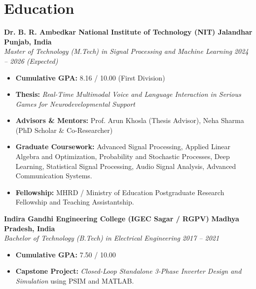 \documentclass[10pt,a4paper]{article}
\begin{document}
\section*{Education}

\textbf{Dr. B. R. Ambedkar National Institute of Technology (NIT) Jalandhar} \hfill \textbf{Punjab, India} \\
\textit{Master of Technology (M.Tech) in Signal Processing and Machine Learning} \hfill \textit{2024 -- 2026 (Expected)}
\begin{itemize}
    \item \textbf{Cumulative GPA:} 8.16 / 10.00 (First Division)
    \item \textbf{Thesis:} \textit{Real-Time Multimodal Voice and Language Interaction in Serious Games for Neurodevelopmental Support}
    \item \textbf{Advisors \& Mentors:} Prof. Arun Khosla (Thesis Advisor), Neha Sharma (PhD Scholar \& Co-Researcher)
    \item \textbf{Graduate Coursework:} Advanced Signal Processing, Applied Linear Algebra and Optimization, Probability and Stochastic Processes, Deep Learning, Statistical Signal Processing, Audio Signal Analysis, Advanced Communication Systems.
    \item \textbf{Fellowship:} MHRD / Ministry of Education Postgraduate Research Fellowship and Teaching Assistantship.
\end{itemize}

\vspace{3pt}
\textbf{Indira Gandhi Engineering College (IGEC Sagar / RGPV)} \hfill \textbf{Madhya Pradesh, India} \\
\textit{Bachelor of Technology (B.Tech) in Electrical Engineering} \hfill \textit{2017 -- 2021}
\begin{itemize}
    \item \textbf{Cumulative GPA:} 7.50 / 10.00
    \item \textbf{Capstone Project:} \textit{Closed-Loop Standalone 3-Phase Inverter Design and Simulation} using PSIM and MATLAB.
\end{itemize}

\end{document}
